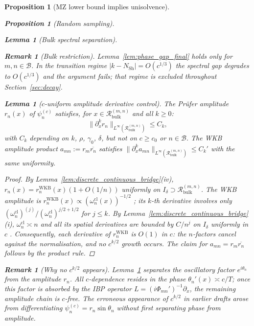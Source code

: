 \documentclass[12pt,a4paper]{amsart}
\newtheorem{lemma}[theorem]{Lemma}
\newtheorem{proposition}[theorem]{Proposition}
\theoremstyle{definition}
\newtheorem{remark}[theorem]{Remark}
\newcommand{\Rbulk}{\mathcal{R}_{\mathrm{bulk}}}
\begin{document}
\begin{proposition}[MZ lower bound implies unisolvence]
\begin{proposition}[Random sampling]
\begin{lemma}[Bulk spectral separation]
\begin{remark}[Bulk restriction]
Lemma~\ref{lem:phase_gap_final} holds only for
$m,n\in\mathcal{B}$. In the transition regime
$|k-N_{\mathrm{Sh}}|=O(c^{1/3})$ the spectral gap degrades to
$O(c^{1/3})$ and the argument fails; that regime is excluded
throughout Section~\ref{sec:decay}.
\end{remark}

\begin{lemma}[$c$-uniform amplitude derivative control]%
\label{lem:amplitude_control}
The Pr\"ufer amplitude $r_n(x)$ of $\psi_n^{(c)}$ satisfies, for
$x\in\Rbulk^{(m,n)}$ and all $k\ge 0$:
\[
  \|\partial_x^k r_n\|_{L^\infty(\Rbulk^{(m,n)})}\le C_k,
\]
with $C_k$ depending on $k$, $\rho$, $\gamma_0$, $\delta$,
but \emph{not} on $c\ge c_0$ or $n\in\mathcal{B}$.
The WKB amplitude product $a_{mn}:=r_m\overline{r_n}$ satisfies
$\|\partial_x^k a_{mn}\|_{L^\infty(\Rbulk^{(m,n)})}\le C_k'$ with the
same uniformity.
\end{lemma}
\begin{proof}
By Lemma~\ref{lem:discrete_continuous_bridge}(iv),
$r_n(x)=r_n^{\mathrm{WKB}}(x)(1+O(1/n))$ uniformly on
$I_\delta\supset\Rbulk^{(m,n)}$. The WKB amplitude is
$r_n^{\mathrm{WKB}}(x)\propto(\omega_n^{\mathrm{cl}}(x))^{-1/2}$
\cite[Definition~4.1]{PaperIV}; its $k$-th derivative involves only
$(\omega_n^{\mathrm{cl}})^{(j)}/(\omega_n^{\mathrm{cl}})^{j/2+1/2}$
for $j\le k$. By Lemma~\ref{lem:discrete_continuous_bridge}(i),
$\omega_n^{\mathrm{cl}}\asymp n$ and all its spatial derivatives are
bounded by $C/n^j$ on $I_\delta$ uniformly in $c$
\cite[Lemma~2.4]{PaperIV}. Consequently, each derivative of
$r_n^{\mathrm{WKB}}$ is $O(1)$ in $c$: the $n$-factors cancel against
the normalisation, and no $c^{k/2}$ growth occurs. The claim for
$a_{mn}=r_m\overline{r_n}$ follows by the product rule.
\end{proof}

\begin{remark}[Why no $c^{k/2}$ appears]
Lemma~\ref{lem:amplitude_control} separates the oscillatory factor
$e^{i\theta_n}$ from the amplitude $r_n$. All $c$-dependence resides
in the phase $\theta_n'(x)\asymp c/T$; once this factor is absorbed
by the IBP operator $L=(i\Phi_{mn}')^{-1}\partial_x$, the remaining
amplitude chain is $c$-free. The erroneous appearance of $c^{k/2}$
in earlier drafts arose from differentiating
$\psi_n^{(c)}=r_n\sin\theta_n$ without first separating phase from
amplitude.
\end{remark}


\end{lemma}
\end{proposition}
\end{proposition}
\end{document}
